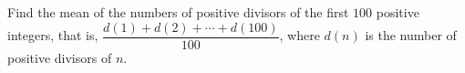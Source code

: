 Find the mean of the numbers of positive divisors of the first $100$ positive integers, that is, $\dfrac{d(1)+d(2)+\cdots+d(100)}{100}$, where $d(n)$ is the number of positive divisors of $n$.
